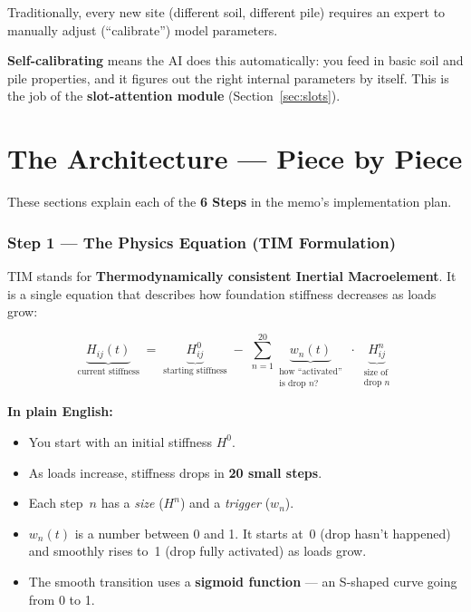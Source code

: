 \documentclass[11pt,a4paper]{article}
\begin{document}
Traditionally, every new site (different soil, different pile) requires an
expert to manually adjust (``calibrate'') model parameters.

\textbf{Self-calibrating} means the AI does this automatically: you feed in
basic soil and pile properties, and it figures out the right internal
parameters by itself.  This is the job of the \textbf{slot-attention module}
(Section~\ref{sec:slots}).


\newpage
\part{The Architecture --- Piece by Piece}

These sections explain each of the \textbf{6 Steps} in the memo's
implementation plan.

\section{Step 1 --- The Physics Equation (TIM Formulation)}
\label{sec:TIM}

TIM stands for \textbf{Thermodynamically consistent Inertial Macroelement}.
It is a single equation that describes how foundation stiffness decreases
as loads grow:

\begin{equation*}
  \underbrace{H_{ij}(t)}_{\text{current stiffness}}
  \;=\;
  \underbrace{H^0_{ij}}_{\text{starting stiffness}}
  \;-\;
  \sum_{n=1}^{20}
  \underbrace{w_n(t)}_{\substack{\text{how ``activated''} \\
                                   \text{is drop } n\text{?}}}
  \;\cdot\;
  \underbrace{H^n_{ij}}_{\substack{\text{size of} \\
                                    \text{drop } n}}
\end{equation*}

\textbf{In plain English:}
\begin{itemize}[noitemsep]
  \item You start with an initial stiffness $H^0$.
  \item As loads increase, stiffness drops in \textbf{20 small steps}.
  \item Each step~$n$ has a \textit{size} ($H^n$) and a \textit{trigger}
        ($w_n$).
  \item $w_n(t)$ is a number between 0 and 1.  It starts at~0 (drop hasn't
        happened) and smoothly rises to~1 (drop fully activated) as loads
        grow.
  \item The smooth transition uses a \textbf{sigmoid function} --- an
        S-shaped curve going from 0 to 1.
\end{itemize}
\end{document}
